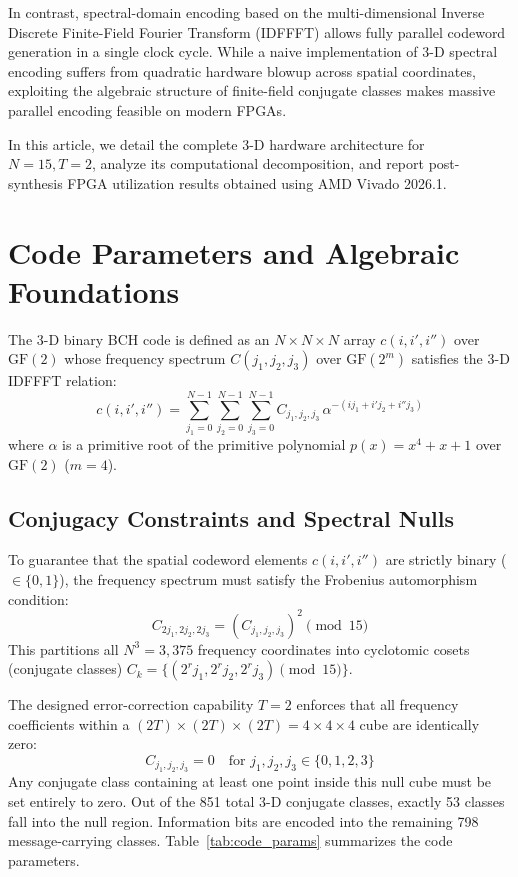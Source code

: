 \documentclass[11pt,a4paper]{article}
\begin{document}
In contrast, spectral-domain encoding based on the multi-dimensional Inverse Discrete Finite-Field Fourier Transform (IDFFFT) allows fully parallel codeword generation in a single clock cycle. While a naive implementation of 3-D spectral encoding suffers from quadratic hardware blowup across spatial coordinates, exploiting the algebraic structure of finite-field conjugate classes makes massive parallel encoding feasible on modern FPGAs.

In this article, we detail the complete 3-D hardware architecture for $N=15, T=2$, analyze its computational decomposition, and report post-synthesis FPGA utilization results obtained using AMD Vivado 2026.1.

\section{Code Parameters and Algebraic Foundations}

The 3-D binary BCH code is defined as an $N \times N \times N$ array $c(i, i', i'')$ over $\text{GF}(2)$ whose frequency spectrum $C(j_1, j_2, j_3)$ over $\text{GF}(2^m)$ satisfies the 3-D IDFFFT relation:
\begin{equation}
c(i, i', i'') = \sum_{j_1=0}^{N-1} \sum_{j_2=0}^{N-1} \sum_{j_3=0}^{N-1} C_{j_1, j_2, j_3} \, \alpha^{-(i j_1 + i' j_2 + i'' j_3)}
\label{eq:idffft}
\end{equation}
where $\alpha$ is a primitive root of the primitive polynomial $p(x) = x^4 + x + 1$ over $\text{GF}(2)$ ($m=4$).

\subsection{Conjugacy Constraints and Spectral Nulls}
To guarantee that the spatial codeword elements $c(i, i', i'')$ are strictly binary ($\in \{0, 1\}$), the frequency spectrum must satisfy the Frobenius automorphism condition:
\begin{equation}
C_{2 j_1, 2 j_2, 2 j_3} = \left( C_{j_1, j_2, j_3} \right)^2 \pmod{15}
\end{equation}
This partitions all $N^3 = 3,375$ frequency coordinates into cyclotomic cosets (conjugate classes) $C_k = \{ (2^r j_1, 2^r j_2, 2^r j_3) \pmod{15} \}$.

The designed error-correction capability $T=2$ enforces that all frequency coefficients within a $(2T) \times (2T) \times (2T) = 4 \times 4 \times 4$ cube are identically zero:
\begin{equation}
C_{j_1, j_2, j_3} = 0 \quad \text{for } j_1, j_2, j_3 \in \{0, 1, 2, 3\}
\end{equation}
Any conjugate class containing at least one point inside this null cube must be set entirely to zero. Out of the 851 total 3-D conjugate classes, exactly 53 classes fall into the null region. Information bits are encoded into the remaining 798 message-carrying classes. Table~\ref{tab:code_params} summarizes the code parameters.
\end{document}
